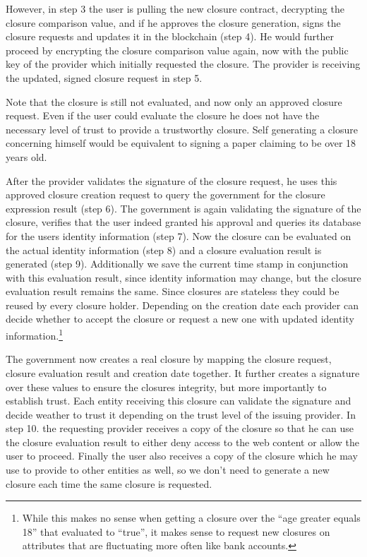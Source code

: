However, in step 3 the user is pulling the new closure contract, decrypting the closure comparison value, and if he approves the closure generation, signs the closure requests and updates it in the blockchain (step 4). He would further proceed by encrypting the closure comparison value again, now with the public key of the provider which initially requested the closure. The provider is receiving the updated, signed closure request in step 5.

Note that the closure is still not evaluated, and now only an approved closure request. Even if the user could evaluate the closure he does not have the necessary level of trust to provide a trustworthy closure. Self generating a closure concerning himself would be equivalent to signing a paper claiming to be over 18 years old.

After the provider validates the signature of the closure request, he uses this approved closure creation request to query the government for the closure expression result (step 6). The government is again validating the signature of the closure, verifies that the user indeed granted his approval and queries its database for the users identity information (step 7). Now the closure can be evaluated on the actual identity information (step 8) and a closure evaluation result is generated (step 9). Additionally we save the current time stamp in conjunction with this evaluation result, since identity information may change, but the closure evaluation result remains the same. Since closures are stateless they could be reused by every closure holder. Depending on the creation date each provider can decide whether to accept the closure or request a new one with updated identity information.\footnote{While this makes no sense when getting a closure over the “age greater equals 18” that evaluated to “true”, it makes sense to request new closures on attributes that are fluctuating more often like bank accounts.}

The government now creates a real closure by mapping the closure request, closure evaluation result and creation date together. It further creates a signature over these values to ensure the closures integrity, but more importantly to establish trust. Each entity receiving this closure can validate the signature and decide weather to trust it depending on the trust level of the issuing provider. In step 10. the requesting provider receives a copy of the closure so that he can use the closure evaluation result to either deny access to the web content or allow the user to proceed. Finally the user also receives a copy of the closure which he may use to provide to other entities as well, so we don’t need to generate a new closure each time the same closure is requested.

